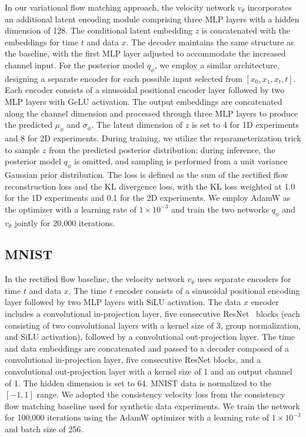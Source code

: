In our variational flow matching approach, the velocity network \(v_\theta\) incorporates an additional latent encoding module comprising three MLP layers with a hidden dimension of 128. The conditional latent embedding \(z\) is concatenated with the embeddings for time \(t\) and data \(x\). The decoder maintains the same structure as the baseline, with the first MLP layer adjusted to accommodate the increased channel input. For the posterior model \(q_\phi\), we employ a similar architecture, designing a separate encoder for each possible input selected from \([x_0, x_1, x_t, t]\). Each encoder consists of a sinusoidal positional encoder layer followed by two MLP layers with GeLU activation. The output embeddings are concatenated along the channel dimension and processed through three MLP layers to produce the predicted \(\mu_\phi\) and \(\sigma_\phi\). The latent dimension of \(z\) is set to 4 for 1D experiments and 8 for 2D experiments. During training, we utilize the reparameterization trick to sample \(z\) from the predicted posterior distribution; during inference, the posterior model \(q_\phi\) is omitted, and sampling is performed from a unit variance Gaussian prior distribution. The loss is defined as the sum of the rectified flow reconstruction loss and the KL divergence loss, with the KL loss weighted at 1.0 for the 1D experiments and 0.1 for the 2D experiments. We employ AdamW as the optimizer with a learning rate of \(1 \times 10^{-3}\) and train the two networks $q_\phi$ and $v_\theta$ jointly for 20,000 iterations.

\subsection{MNIST}
\label{app:implement_mnist}

In the rectified flow baseline, the velocity network \(v_\theta\) uses separate encoders for time \(t\) and data \(x\). The time \(t\) encoder consists of a sinusoidal positional encoding layer followed by two MLP layers with SiLU activation. The data \(x\) encoder includes a convolutional in-projection layer, five consecutive ResNet~\cite{he2015deepresiduallearningimage} blocks (each consisting of two convolutional layers with a kernel size of 3, group normalization, and SiLU activation), followed by a convolutional out-projection layer. The time and data embeddings are concatenated and passed to a decoder composed of a convolutional in-projection layer, five consecutive ResNet blocks, and a convolutional out-projection layer with a kernel size of 1 and an output channel of 1. The hidden dimension is set to 64. MNIST data is normalized to the \([-1,1]\) range. We adopted the  consistency velocity loss from the consistency flow matching baseline  used for synthetic data experiments. We train the network for 100,000 iterations using the AdamW optimizer with a learning rate of \(1 \times 10^{-3}\) and batch size of 256.

